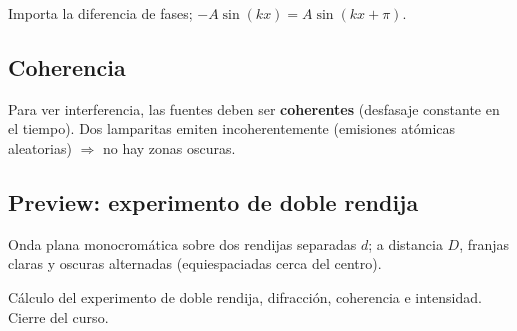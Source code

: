 \documentclass[12pt,a4paper]{article}
\begin{document}
Importa la diferencia de fases; $-A\sin(kx) = A\sin(kx + \pi)$.



\subsection{Coherencia}

Para ver interferencia, las fuentes deben ser \textbf{coherentes} (desfasaje
constante en el tiempo). Dos lamparitas emiten incoherentemente (emisiones
atómicas aleatorias) $\Rightarrow$ no hay zonas oscuras.



\subsection{Preview: experimento de doble rendija}

Onda plana monocromática sobre dos rendijas separadas $d$; a distancia $D$,
franjas claras y oscuras alternadas (equiespaciadas cerca del centro).

\begin{notebox}
  Cálculo del experimento de doble rendija, difracción, coherencia e intensidad.
  Cierre del curso.
\end{notebox}
\end{document}
